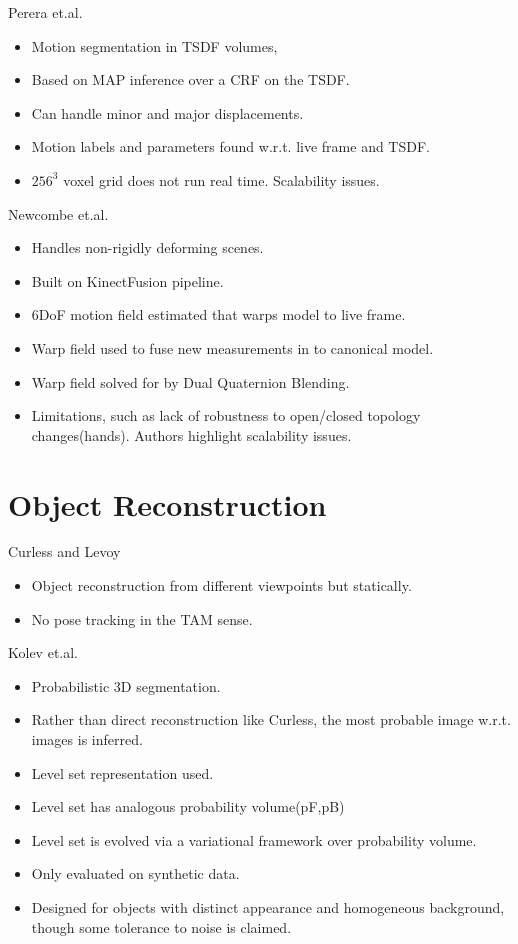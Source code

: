 Perera et.al. \cite{Perera2015}
\begin{itemize}
	\item Motion segmentation in TSDF volumes,
	\item Based on MAP inference over a CRF on the TSDF.
	\item Can handle minor and major displacements.
	\item Motion labels and parameters found w.r.t. live frame and TSDF.
	\item $256^{3}$ voxel grid does not run real time. Scalability issues.
\end{itemize}

Newcombe et.al. \cite{Newcombe2015}
\begin{itemize}
	\item Handles non-rigidly deforming scenes.
	\item Built on KinectFusion pipeline.
	\item 6DoF motion field estimated that warps model to live frame.
	\item Warp field used to fuse new measurements in to canonical model.
	\item Warp field solved for by Dual Quaternion Blending. \cite{Kavan2006}
	\item Limitations, such as lack of robustness to open/closed topology changes(hands). Authors highlight scalability issues.
\end{itemize}

\section{Object Reconstruction}
\label{sec:lit_review_obj_recon}
Curless and Levoy \cite{Curless1996}
\begin{itemize}
	\item Object reconstruction from different viewpoints but statically.
	\item No pose tracking in the TAM sense.
\end{itemize}

Kolev et.al. \cite{Kolev2006}
\begin{itemize}
	\item Probabilistic 3D segmentation.
	\item Rather than direct reconstruction like Curless, the most probable image w.r.t. images is inferred.
	\item Level set representation used.
	\item Level set has analogous probability volume(pF,pB)
	\item Level set is evolved via a variational framework over probability volume.
	\item Only evaluated on synthetic data.
	\item Designed for objects with distinct appearance and homogeneous background, though some tolerance to noise is claimed.
\end{itemize}

